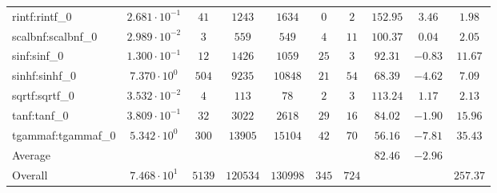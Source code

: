 \begin{tabular}{|l|c|c|c|c|c|c|c|c|c|}
rintf:rintf\_0           & $ 2.681 \cdot 10^{-1} $ & $ 41     $ & $ 1243   $ & $ 1634   $ & $ 0   $ & $ 2   $ & $ 152.95      $ & $ 3.46    $ & $ 1.98    $ \\
scalbnf:scalbnf\_0       & $ 2.989 \cdot 10^{-2} $ & $ 3      $ & $ 559    $ & $ 549    $ & $ 4   $ & $ 11  $ & $ 100.37      $ & $ 0.04    $ & $ 2.05    $ \\
sinf:sinf\_0             & $ 1.300 \cdot 10^{-1} $ & $ 12     $ & $ 1426   $ & $ 1059   $ & $ 25  $ & $ 3   $ & $ 92.31       $ & $ -0.83   $ & $ 11.67   $ \\
sinhf:sinhf\_0           & $ 7.370 \cdot 10^{0}  $ & $ 504    $ & $ 9235   $ & $ 10848  $ & $ 21  $ & $ 54  $ & $ 68.39       $ & $ -4.62   $ & $ 7.09    $ \\
sqrtf:sqrtf\_0           & $ 3.532 \cdot 10^{-2} $ & $ 4      $ & $ 113    $ & $ 78     $ & $ 2   $ & $ 3   $ & $ 113.24      $ & $ 1.17    $ & $ 2.13    $ \\
tanf:tanf\_0             & $ 3.809 \cdot 10^{-1} $ & $ 32     $ & $ 3022   $ & $ 2618   $ & $ 29  $ & $ 16  $ & $ 84.02       $ & $ -1.90   $ & $ 15.96   $ \\
tgammaf:tgammaf\_0       & $ 5.342 \cdot 10^{0}  $ & $ 300    $ & $ 13905  $ & $ 15104  $ & $ 42  $ & $ 70  $ & $ 56.16       $ & $ -7.81   $ & $ 35.43   $ \\
\hline
Average                  & $                     $ & $        $ & $        $ & $        $ & $     $ & $     $ & $ 82.46       $ & $ -2.96   $ & $         $ \\
\hline
Overall                  & $ 7.468 \cdot 10^{1}  $ & $ 5139   $ & $ 120534 $ & $ 130998 $ & $ 345 $ & $ 724 $ & $             $ & $         $ & $ 257.37  $ \\
\hline
\end{tabular}
